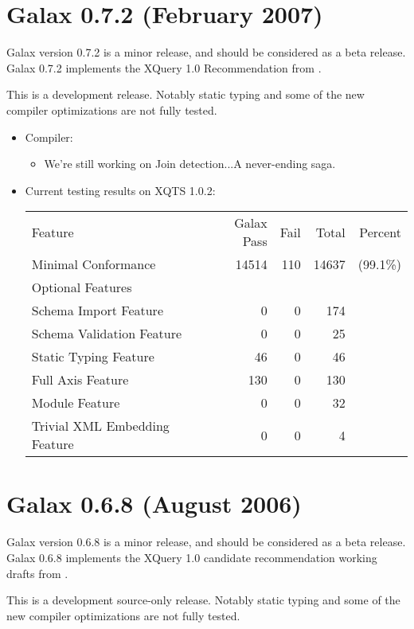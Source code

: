 \section{Galax 0.7.2 (February 2007)}

Galax version 0.7.2 is a minor release, and should be considered as a
beta release. Galax 0.7.2 implements the XQuery 1.0 Recommendation
from \xqueryrec.

This is a development release.  Notably static typing and
some of the new compiler optimizations are not fully tested.

\begin{itemize}
\item Compiler:
  \begin{itemize}
  \item We're still working on Join detection...A never-ending saga.
  \end{itemize}

\item Current testing results on XQTS 1.0.2:
\begin{tabular}{lrrrr}
  Feature & Galax Pass & Fail & Total & Percent\\
  Minimal Conformance	 &         14514 & 110 & 14637 & (99.1\%) \\
  Optional Features & \\
    Schema Import Feature&	  0   	& 0   & 174\\
    Schema Validation Feature&	  0   	& 0   & 25\\
    Static Typing Feature	&  46  	& 0   & 46\\
    Full Axis Feature	 	&  130 	& 0   & 130\\
    Module Feature	 	&  0 	& 0   & 32\\
    Trivial XML Embedding Feature &0 	& 0   & 4\\
\end{tabular}
\end{itemize}

\section{Galax 0.6.8 (August 2006)}

Galax version 0.6.8 is a minor release, and should be considered as a
beta release. Galax 0.6.8 implements the XQuery 1.0 candidate
recommendation working drafts from \xqueryversion.

This is a development source-only release.  Notably static typing and
some of the new compiler optimizations are not fully tested.

